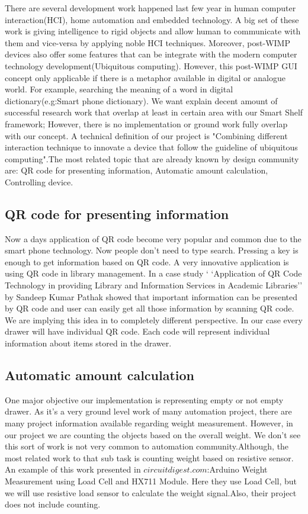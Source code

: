 There are several development work happened last few year in human computer interaction(HCI), home automation and embedded technology. A big set of these work is giving intelligence to rigid objects and allow human to communicate with them and vice-versa by applying noble HCI techniques. Moreover, post-WIMP devices also offer some features that can be integrate with the modern computer technology development(Ubiquitous computing). However, this post-WIMP GUI concept only applicable if there is a metaphor available in digital or analogue world. For example, searching the meaning of a word in digital dictionary(e.g:Smart phone dictionary). We want explain decent amount of successful research work that overlap at least in certain area with our Smart Shelf framework; However, there is no implementation or ground work fully overlap with our concept. A technical definition of our project is "Combining different interaction technique to innovate a device that follow the guideline of ubiquitous computing".The most related topic that are already known by design community are: QR code for presenting information, Automatic amount calculation, Controlling device.    
\subsection{QR code for presenting information}
Now a days application of QR code become very popular and common due to the smart phone technology. Now people don't need to type search. Pressing a key is enough to get information based on QR code. A very innovative application is using QR code in library management. In a case study ` `Application of QR Code Technology in providing Library and Information Services in Academic Libraries'' by  Sandeep
Kumar Pathak showed that important information can be presented by QR code and user can easily get all those information by scanning QR code. 
We are implying this idea in to completely different perspective. In our case every drawer will have individual QR code. Each code will represent individual information about items stored in the drawer. 
\subsection{Automatic amount calculation}
One major objective our implementation is representing empty or not empty drawer. As it's a very ground level work of many automation project, there are many project information available regarding weight measurement. However, in our project we are counting the objects based on the overall weight. We don't see this sort of work is not very common to automation community.Although, the most related work to that sub task is counting weight based on resistive sensor. An example of this work presented in $circuitdigest.com$:Arduino Weight Measurement using Load Cell and HX711 Module. Here they use Load Cell, but we will use resistive load sensor to calculate the weight signal.Also, their project does not include counting.
